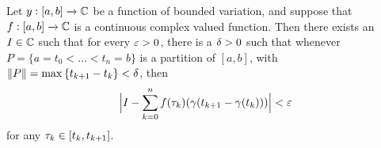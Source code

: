 \begin{theorem}\label{4.1.6}
    Let $y:[a,b] \xrightarrow{} \mathbb{C}$ be a function of bounded variation, and
    suppose that $f:[a,b] \xrightarrow{} \mathbb{C}$ is a continuous complex valued
    function. Then there exists an $I \in \mathbb{C}$ such that for every $\varepsilon>0$, there
    is a $\delta>0$ such that whenever  $P=\{a=t_0<\dots<t_n=b\}$ is a partition of
    $[a,b]$, with $\|P\|=\max{\{t_{k+1}-t_k\}}<\delta$, then
    \begin{equation*}
        \Big{|} I-\sum_{k=0}^n{f(\tau_k)(\gamma(t_{k+1}-\gamma(t_k)))} \Big{|}<\varepsilon
    \end{equation*}
    for any $\tau_k \in [t_k,t_{k+1}]$.
\end{theorem}
